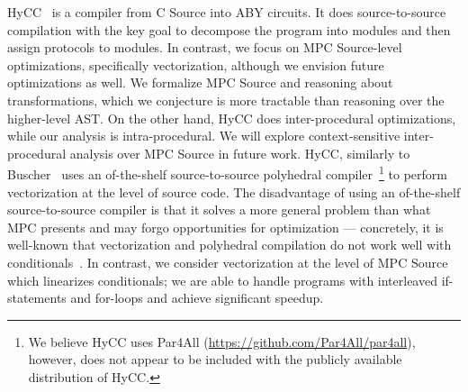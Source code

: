 HyCC~\cite{CCS:BDKKS18} is a compiler from C Source into ABY circuits. It does source-to-source compilation with the key goal to decompose the 
program into modules and then assign protocols to modules. In contrast, we focus on MPC Source-level optimizations, specifically vectorization, although we envision 
future optimizations as well. We formalize MPC Source and reasoning about transformations, which we conjecture is more tractable than reasoning over
the higher-level AST. On the other hand, HyCC does inter-procedural optimizations, while our analysis is intra-procedural. We will explore context-sensitive inter-procedural 
analysis over MPC Source in future work. HyCC, similarly to Buscher~\cite{Buscher:2018} uses an of-the-shelf source-to-source polyhedral compiler~\footnote{We believe HyCC uses 
Par4All (\url{https://github.com/Par4All/par4all}), however, does not appear to be included with the publicly available distribution of HyCC.}
to perform vectorization at the level of source code. The disadvantage of using an of-the-shelf source-to-source compiler is that it solves a more general 
problem than what MPC presents and may forgo opportunities for optimization --- concretely, it is well-known that vectorization and polyhedral compilation 
do not work well with conditionals~\cite{Benabderrahmane:2010,Karrenberg:2015}. In contrast, we consider vectorization at the level of MPC Source which 
linearizes conditionals; we are able to handle programs with interleaved if-statements and for-loops and achieve significant speedup. 
 

\squeeze
